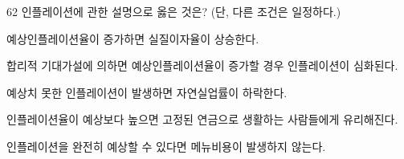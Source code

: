 \begin{question}{62}
인플레이션에 관한 설명으로 옳은 것은? (단, 다른 조건은 일정하다.)
\begin{choices}
  \item 예상인플레이션율이 증가하면 실질이자율이 상승한다.
  \item 합리적 기대가설에 의하면 예상인플레이션율이 증가할 경우 인플레이션이 심화된다.
  \item 예상치 못한 인플레이션이 발생하면 자연실업률이 하락한다.
  \item 인플레이션율이 예상보다 높으면 고정된 연금으로 생활하는 사람들에게 유리해진다.
  \item 인플레이션을 완전히 예상할 수 있다면 메뉴비용이 발생하지 않는다.
\end{choices}
\end{question}
